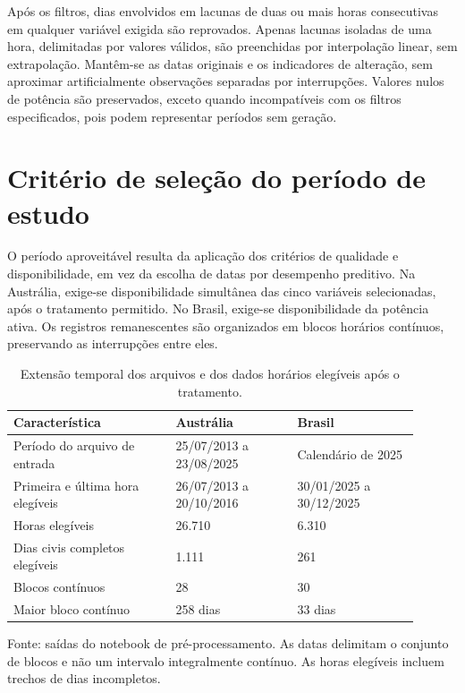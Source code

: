 Após os filtros, dias envolvidos em lacunas de duas ou mais horas consecutivas em qualquer variável exigida são reprovados. Apenas lacunas isoladas de uma hora, delimitadas por valores válidos, são preenchidas por interpolação linear, sem extrapolação. Mantêm-se as datas originais e os indicadores de alteração, sem aproximar artificialmente observações separadas por interrupções. Valores nulos de potência são preservados, exceto quando incompatíveis com os filtros especificados, pois podem representar períodos sem geração.

\section{Critério de seleção do período de estudo}
\label{sec:recorte_temporal}

O período aproveitável resulta da aplicação dos critérios de qualidade e disponibilidade, em vez da escolha de datas por desempenho preditivo. Na Austrália, exige-se disponibilidade simultânea das cinco variáveis selecionadas, após o tratamento permitido. No Brasil, exige-se disponibilidade da potência ativa. Os registros remanescentes são organizados em blocos horários contínuos, preservando as interrupções entre eles.

\begin{table}[htbp]
\centering
\caption{Extensão temporal dos arquivos e dos dados horários elegíveis após o tratamento.}
\label{tab:periodos_estudo}
\small
\begin{tabular}{p{0.36\linewidth}p{0.27\linewidth}p{0.27\linewidth}}
\hline
Característica & Austrália & Brasil \\
\hline
Período do arquivo de entrada & 25/07/2013 a 23/08/2025 & Calendário de 2025 \\
Primeira e última hora elegíveis & 26/07/2013 a 20/10/2016 & 30/01/2025 a 30/12/2025 \\
Horas elegíveis & 26.710 & 6.310 \\
Dias civis completos elegíveis & 1.111 & 261 \\
Blocos contínuos & 28 & 30 \\
Maior bloco contínuo & 258 dias & 33 dias \\
\hline
\end{tabular}
\par\smallskip
{\footnotesize Fonte: saídas do notebook de pré-processamento. As datas delimitam o conjunto de blocos e não um intervalo integralmente contínuo. As horas elegíveis incluem trechos de dias incompletos.}
\end{table}

